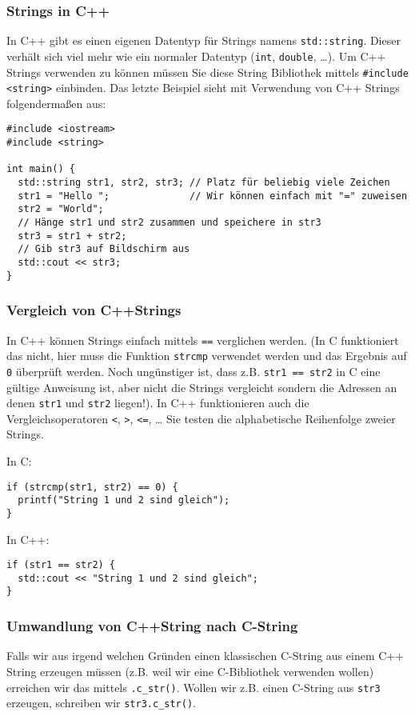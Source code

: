 \documentclass[11pt]{article}
\begin{document}
\subsubsection{Strings in C++}
\label{sec-4-6-2}
In C++ gibt es einen eigenen Datentyp für Strings namens
\verb~std::string~. Dieser verhält sich viel mehr wie ein normaler Datentyp
(\verb~int~, \verb~double~, \ldots{}). Um C++ Strings verwenden zu können müssen Sie
diese String Bibliothek mittels \verb~#include <string>~ einbinden. Das
letzte Beispiel sieht mit Verwendung von C++ Strings folgendermaßen
aus:
\begin{verbatim}
#include <iostream>
#include <string>

int main() {
  std::string str1, str2, str3; // Platz für beliebig viele Zeichen
  str1 = "Hello ";              // Wir können einfach mit "=" zuweisen
  str2 = "World";
  // Hänge str1 und str2 zusammen und speichere in str3
  str3 = str1 + str2;
  // Gib str3 auf Bildschirm aus
  std::cout << str3;
}
\end{verbatim}
\subsubsection{Vergleich von C++Strings}
\label{sec-4-6-3}
In C++ können Strings einfach mittels \verb~==~ verglichen werden. (In C
funktioniert das nicht, hier muss die Funktion \verb~strcmp~ verwendet
werden und das Ergebnis auf \verb~0~ überprüft werden. Noch ungünstiger
ist, dass z.B. \verb~str1 == str2~ in C eine gültige Anweisung ist, aber
nicht die Strings vergleicht sondern die Adressen an denen \verb~str1~ und
\verb~str2~ liegen!). In C++ funktionieren auch die Vergleichsoperatoren
\verb~<~, \verb~>~, \verb~<=~, \ldots{} Sie testen die alphabetische Reihenfolge zweier
Strings.

In C:
\begin{verbatim}
if (strcmp(str1, str2) == 0) {
  printf("String 1 und 2 sind gleich");
}
\end{verbatim}

In C++:
\begin{verbatim}
if (str1 == str2) {
  std::cout << "String 1 und 2 sind gleich";
}
\end{verbatim}
\subsubsection{Umwandlung von C++String nach C-String}
\label{sec-4-6-4}
Falls wir aus irgend welchen Gründen einen klassischen C-String aus
einem C++ String erzeugen müssen (z.B. weil wir eine C-Bibliothek
verwenden wollen) erreichen wir das mittels \verb~.c_str()~. Wollen wir
z.B. einen C-String aus \verb~str3~ erzeugen, schreiben wir \verb~str3.c_str()~.
\end{document}
